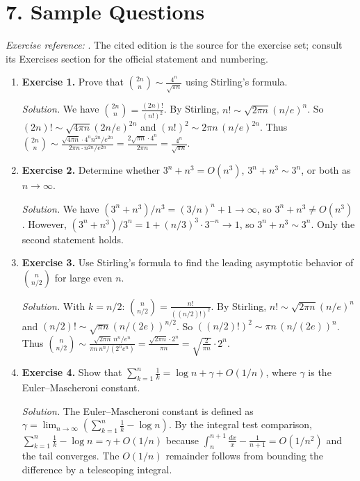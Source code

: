 \section*{7. Sample Questions}
\emph{Exercise reference:} \cite{asymptotic_theory_ref1}. The cited edition is the source for the exercise set; consult its Exercises section for the official statement and numbering.
\begin{enumerate}[leftmargin=*,itemsep=0.9em]

\item \textbf{Exercise 1.} Prove that $\binom{2n}{n}\sim \frac{4^n}{\sqrt{\pi n}}$ using Stirling's formula.

\emph{Solution.} We have $\binom{2n}{n}=\frac{(2n)!}{(n!)^2}$. By Stirling, $n!\sim\sqrt{2\pi n}(n/e)^n$. So $(2n)!\sim\sqrt{4\pi n}(2n/e)^{2n}$ and $(n!)^2\sim 2\pi n\,(n/e)^{2n}$. Thus $\binom{2n}{n}\sim\frac{\sqrt{4\pi n}\cdot 4^n n^{2n}/e^{2n}}{2\pi n\cdot n^{2n}/e^{2n}}=\frac{2\sqrt{\pi n}\cdot 4^n}{2\pi n}=\frac{4^n}{\sqrt{\pi n}}$.

\item \textbf{Exercise 2.} Determine whether $3^n+n^3=O(n^3)$, $3^n+n^3\sim 3^n$, or both as $n\to\infty$.

\emph{Solution.} We have $(3^n+n^3)/n^3=(3/n)^n+1\to\infty$, so $3^n+n^3\ne O(n^3)$. However, $(3^n+n^3)/3^n=1+(n/3)^3\cdot 3^{-n}\to 1$, so $3^n+n^3\sim 3^n$. Only the second statement holds.

\item \textbf{Exercise 3.} Use Stirling's formula to find the leading asymptotic behavior of $\binom{n}{n/2}$ for large even $n$.

\emph{Solution.} With $k=n/2$: $\binom{n}{n/2}=\frac{n!}{((n/2)!)^2}$. By Stirling, $n!\sim\sqrt{2\pi n}(n/e)^n$ and $(n/2)!\sim\sqrt{\pi n}(n/(2e))^{n/2}$. So $((n/2)!)^2\sim \pi n\,(n/(2e))^n$. Thus $\binom{n}{n/2}\sim\frac{\sqrt{2\pi n}\,n^n/e^n}{\pi n\,n^n/(2^n e^n)}=\frac{\sqrt{2\pi n}\cdot 2^n}{\pi n}=\sqrt{\frac{2}{\pi n}}\cdot 2^n$.

\item \textbf{Exercise 4.} Show that $\sum_{k=1}^{n}\frac{1}{k}=\log n+\gamma+O(1/n)$, where $\gamma$ is the Euler--Mascheroni constant.

\emph{Solution.} The Euler--Mascheroni constant is defined as $\gamma=\lim_{n\to\infty}\left(\sum_{k=1}^n\frac{1}{k}-\log n\right)$. By the integral test comparison, $\sum_{k=1}^n\frac{1}{k}-\log n=\gamma+O(1/n)$ because $\int_n^{n+1}\frac{dx}{x}-\frac{1}{n+1}=O(1/n^2)$ and the tail converges. The $O(1/n)$ remainder follows from bounding the difference by a telescoping integral.


\end{enumerate}
